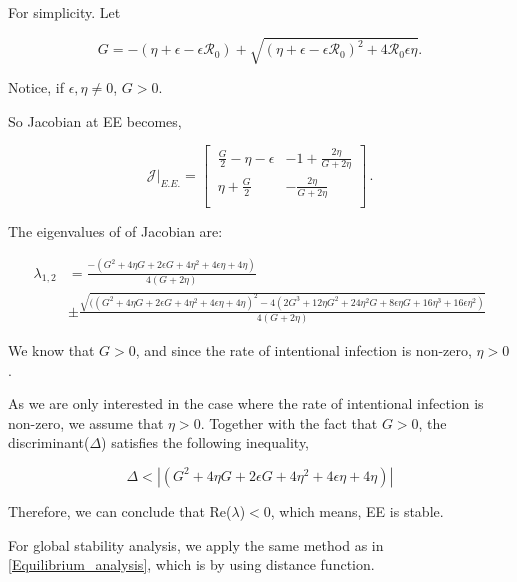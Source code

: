 \documentclass[12pt]{article}
\newcommand{\R}{\mathcal{R}}
\begin{document}
For simplicity. Let 
\begin{linenomath*}
\begin{equation}
G=-(\eta+\epsilon-\epsilon\R_0)+\sqrt{(\eta+\epsilon-\epsilon\R_0)^2+4\R_0\epsilon \eta}.
\end{equation}
\end{linenomath*}
Notice, if $\epsilon,\eta\neq 0$, $G>0$. 

So Jacobian at EE becomes,
\begin{linenomath*}
\begin{equation}
\mathcal{J}|_{E.E.}=
\begin{bmatrix}
    \ \frac{G}{2}-\eta-\epsilon       & -1+\frac{2\eta}{G+2\eta} \\
    \ \eta+\frac{G}{2}       & -\frac{2\eta}{G+2\eta} \\
\end{bmatrix}\,.
\end{equation}
\end{linenomath*}

The eigenvalues of of Jacobian are:

\begin{linenomath*}
\begin{align}
\lambda_{1,2} &= \frac{-(G^2+4\eta G+2\epsilon G+4\eta^2+4\epsilon\eta+4\eta) }{4(G+2\eta)}\\
& \pm \frac{\sqrt{((G^2+4\eta G+2\epsilon G+4\eta^2+4\epsilon\eta+4\eta)^2-4(2G^3+12\eta G^2+24\eta^2 G+8\epsilon\eta G+16\eta^3+16\epsilon\eta^2)}}{4(G+2\eta)}
\end{align}
\end{linenomath*}

We know that $G>0$, and since the rate of intentional infection is non-zero, $\eta >0$.

As we are only interested in the case where the rate of intentional infection is non-zero, we assume that $\eta>0$. Together with the fact that $G>0$, the discriminant($\Delta$) satisfies the following inequality,
\begin{linenomath*}
\begin{equation}
\Delta<|(G^2+4\eta G+2\epsilon G+4\eta^2+4\epsilon\eta+4\eta)|
\end{equation}
\end{linenomath*}

Therefore, we can conclude that Re($\lambda$)$<0$, which means, EE is stable.

For global stability analysis, we apply the same method as in \autoref{Equilibrium_analysis}, which is by using distance function.
\end{document}
